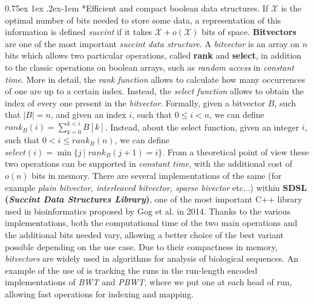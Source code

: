 \documentclass[a4paper,11pt, oneside]{article}
\makeatletter
\newcommand{\dc}[1]{\todo{\textbf{DC} #1}}
\renewcommand{\paragraph}{%
  \@startsection{paragraph}{4}%
  {\z@}{0.75ex \@plus 1ex \@minus .2ex}{-1em}%
  {\normalfont\normalsize\bfseries}%
}
\makeatother
\begin{document}
\paragraph*{Efficient and compact boolean data structures.}
If $\mathcal{X}$ is the optimal number of bits needed to store some data, a
representation of this information is defined \textit{succint} if it takes
$\mathcal{X} +o(\mathcal{X})$ bits of space. 
\textbf{Bitvectors} are one of the most important \textit{succint data
  structure}.  
A \textit{bitvector} is an array on $n$ bits which allows two particular
operations, called \textbf{rank} and \textbf{select}, in addition to the classic
operations on boolean arrays, such as \textit{random access} in
\textit{constant time}. More in detail, the \textit{rank
function} allows to calculate how many occurrences of one are up to a certain
index. Instead, the \textit{select function} allows to obtain the index of every
one present in the \textit{bitvector}. Formally, given a bitvector $B$, such
that $|B|=n$, and given an index $i$, such that $0\leq i<n$, we can define
$rank_B(i)=\sum_{k=0}^{k<i} B[k]$. Instead, about the select function, given an
integer $i$, such that $0<i\leq rank_B(n)$, we can define
$select(i)=\min\{j \,| \,\, rank_B(j+1)=i\}$.
From a theoretical point of view these two operations can be supported in
\textit{constant time}, with the additional cost of $o(n)$ bits in
memory. There are several implementations of the 
same (for example \textit{plain bitvector, interleaved
  bitvector, sparse bivector} etc$\ldots$) within \textbf{SDSL (\textit{Succint
    Data Structures Library})}, one of the most important C++ library used in
bioinformatics proposed by Gog et al. in 2014. Thanks to the various
implementations, both the computational time of the two main 
operations and the additional bits needed vary, allowing a
better choice of the best variant possible depending on the use case. Due to
their compactness in memory, \textit{bitvectors} are widely used in algorithms
for analysis of biological sequences. An example of the use of is 
tracking the runs in the run-length encoded implementations of \textit{BWT} and
\textit{PBWT}, where we put one at each head of run, allowing fast operations
for indexing and mapping. 
\end{document}
